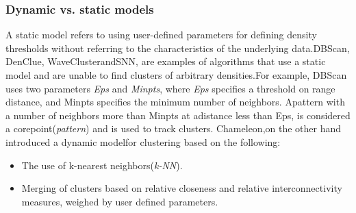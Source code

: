 \subsubsection{Dynamic vs. static models}\label{subsec:dynamic_static} 
A static model refers to using user-defined parameters for defining density thresholds without referring to the characteristics of the underlying data.DBScan, DenClue, WaveClusterandSNN, are examples of algorithms that use a static model and are unable to find clusters of arbitrary densities.For example, DBScan uses two parameters \textit{Eps} and \textit{Minpts}, where \textit{Eps} specifies a threshold on range distance,
and Minpts specifies the minimum number of neighbors.
Apattern with a number of neighbors more than Minpts at adistance less than Eps, is considered a corepoint(\textit{pattern}) and is used to track clusters. Chameleon,on the other hand introduced a dynamic modelfor
clustering based on the following:
\begin{itemize}
\item The use of k-nearest neighbors(\textit{k-NN}).
\item Merging of clusters based on relative closeness and relative interconnectivity measures, weighed by user defined parameters.
\end{itemize}


